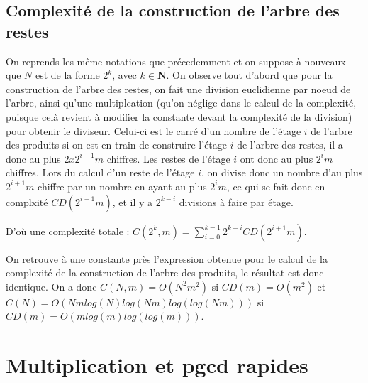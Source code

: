 \documentclass[a4paper,10pt]{article}
\begin{document}
  \subsection{Complexité de la construction de l'arbre des restes}
  On reprends les même notations que précedemment et on suppose à nouveaux que $N$ est de la forme $2^k$, avec $k\in\mathbf{N}$.
  On observe tout d'abord que pour la construction de l'arbre des restes, on fait une division euclidienne par noeud de l'arbre, ainsi qu'une multiplcation (qu'on néglige dans le calcul de la complexité, puisque celà revient à modifier la constante devant la complexité de la division) pour obtenir le diviseur. Celui-ci est le carré d'un nombre de l'étage $i$ de l'arbre des produits si on est en train de construire l'étage $i$ de l'arbre des restes, il a donc au plus $2x2^{i-1}m$ chiffres. Les restes de l'étage $i$ ont donc au plus $2^im$ chiffres.
  Lors du calcul d'un reste de l'étage $i$, on divise donc un nombre d'au plus $2^{i+1}m$ chiffre par un nombre en ayant au plus $2^im$, ce qui se fait donc en complxité $CD(2^{i+1}m)$, et il y a $2^{k-i}$ divisions à faire par étage.
  
  D'où une complexité totale : $C(2^k, m) = \sum_{i=0}^{k-1}2^{k-i}CD(2^{i+1}m)$.
  
  On retrouve à une constante près l'expression obtenue pour le calcul de la complexité de la construction de l'arbre des produits, le résultat est donc identique.
  On a donc $C(N,m) = O(N^2m^2)$ si $CD(m) = O(m^2)$ et $C(N) = O(Nmlog(N)log(Nm)log(log(Nm)))$ si $CD(m) = O(mlog(m)log(log(m)))$.
  

\section{Multiplication et pgcd rapides}
\end{document}
